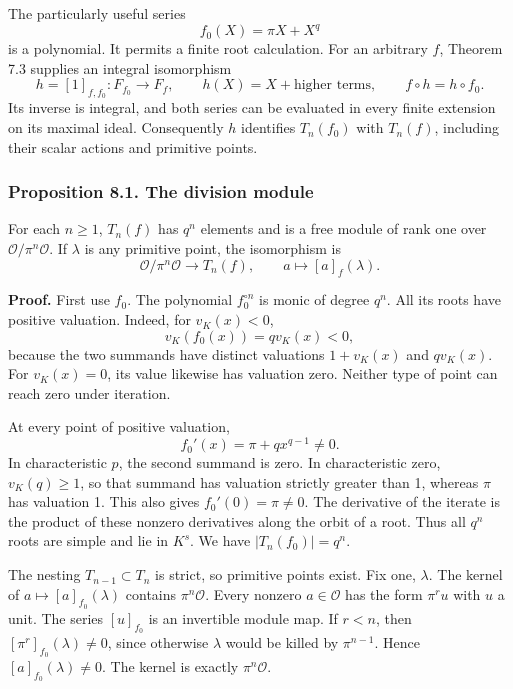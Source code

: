 \documentclass[11pt,a4paper]{article}
\begin{document}
The particularly useful series \[
f_0(X)=\pi X+X^q
\tag{2}
\] is a polynomial. It permits a finite root calculation. For an
arbitrary \(f\), Theorem 7.3 supplies an integral isomorphism \[
h=[1]_{f,f_0}:F_{f_0}\longrightarrow F_f,\qquad
h(X)=X+\text{higher terms},\qquad f\circ h=h\circ f_0.
\tag{3}
\] Its inverse is integral, and both series can be evaluated in every
finite extension on its maximal ideal. Consequently \(h\) identifies
\(T_n(f_0)\) with \(T_n(f)\), including their scalar actions and
primitive points.

\subsubsection{Proposition 8.1. The division
module}\label{proposition-8.1.-the-division-module}

For each \(n\geq1\), \(T_n(f)\) has \(q^n\) elements and is a free
module of rank one over \(\mathcal O/\pi^n\mathcal O\). If \(\lambda\)
is any primitive point, the isomorphism is \[
\mathcal O/\pi^n\mathcal O\longrightarrow T_n(f),\qquad
a\longmapsto[a]_f(\lambda).
\tag{4}
\]

\textbf{Proof.} First use \(f_0\). The polynomial \(f_0^{\circ n}\) is
monic of degree \(q^n\). All its roots have positive valuation. Indeed,
for \(v_K(x)<0\), \[
v_K(f_0(x))=qv_K(x)<0,
\] because the two summands have distinct valuations \(1+v_K(x)\) and
\(qv_K(x)\). For \(v_K(x)=0\), its value likewise has valuation zero.
Neither type of point can reach zero under iteration.

At every point of positive valuation, \[
f_0'(x)=\pi+q x^{q-1}\ne0.
\tag{5}
\] In characteristic \(p\), the second summand is zero. In
characteristic zero, \(v_K(q)\geq1\), so that summand has valuation
strictly greater than 1, whereas \(\pi\) has valuation 1. This also
gives \(f_0'(0)=\pi\ne0\). The derivative of the iterate is the product
of these nonzero derivatives along the orbit of a root. Thus all \(q^n\)
roots are simple and lie in \(K^s\). We have \(|T_n(f_0)|=q^n\).

The nesting \(T_{n-1}\subset T_n\) is strict, so primitive points exist.
Fix one, \(\lambda\). The kernel of \(a\mapsto[a]_{f_0}(\lambda)\)
contains \(\pi^n\mathcal O\). Every nonzero \(a\in\mathcal O\) has the
form \(\pi^r u\) with \(u\) a unit. The series \([u]_{f_0}\) is an
invertible module map. If \(r<n\), then \([\pi^r]_{f_0}(\lambda)\ne0\),
since otherwise \(\lambda\) would be killed by \(\pi^{n-1}\). Hence
\([a]_{f_0}(\lambda)\ne0\). The kernel is exactly \(\pi^n\mathcal O\).
\end{document}
